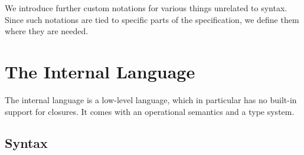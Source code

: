 \documentclass{scrartcl}
\begin{document}
We introduce further custom notations for various things unrelated to
syntax. Since such notations are tied to specific parts of the
specification, we define them where they are needed.

\section{The Internal Language}

The internal language is a low-level language, which in particular has
no built-in support for closures. It comes with an operational semantics
and a type system.

\subsection{Syntax}
\end{document}
